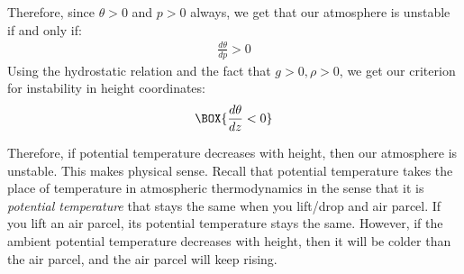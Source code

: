 Therefore, since $\theta>0$ and $p>0$ always, we get that our atmosphere is unstable if and only if:
\begin{align}\label{Dry Stability Potential Temperature}
    \boxed{\frac{d\theta}{dp}>0}
\end{align}
Using the hydrostatic relation and the fact that $g>0,\rho>0$, we get our criterion for instability in height coordinates:
\begin{align}
    \BOX{\frac{d\theta}{dz}<0}
\end{align}

Therefore, if potential temperature decreases with height, then our atmosphere is unstable. This makes physical sense. Recall that potential temperature takes the place of temperature in atmospheric thermodynamics in the sense that it is \textit{potential temperature} that stays the same when you lift/drop and air parcel. If you lift an air parcel, its potential temperature stays the same. However, if the ambient potential temperature decreases with height, then it will be colder than the air parcel, and the air parcel will keep rising.

